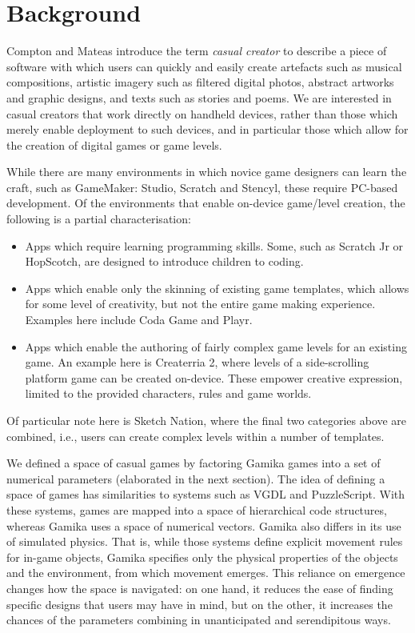 \documentclass{IEEEtran}
\begin{document}
\section{Background}
\label{Section:Backround}
Compton and Mateas \cite{compton2015} introduce the term \emph{casual creator} to describe a piece of software with which users can quickly and easily create artefacts such as musical compositions, artistic imagery such as filtered digital photos, abstract artworks and graphic designs, and texts such as stories and poems. We are interested in casual creators that work directly on handheld devices, rather than those which merely enable deployment to such devices, and in particular those which allow for the creation of digital games or game levels.

While there are many environments in which novice game designers can learn the craft, such as GameMaker: Studio, Scratch and Stencyl, these require PC-based development. Of the environments that enable on-device game/level creation, the following is a partial characterisation:

\begin{itemize}
\item Apps which require learning programming skills. Some,
such as Scratch Jr or HopScotch, are designed to introduce children to coding.
\item Apps which enable only the skinning of existing game
templates, which allows for some level of creativity, but
not the entire game making experience. Examples here
include Coda Game and Playr.
\item Apps which enable the authoring of fairly complex game
levels for an existing game. An example here is Createrria
2, where levels of a side-scrolling platform game can be
created on-device. These empower creative expression,
limited to the provided characters, rules and game worlds.
\end{itemize} 

Of particular note here is Sketch Nation, where the final two categories above are combined, i.e., users can create complex levels within a number of templates.

We defined a space of casual games by factoring Gamika games into a set of numerical parameters (elaborated in the next section). The idea of defining a space of games has similarities to systems such as VGDL \cite{schaul:vgdl} and PuzzleScript. With these systems, games are mapped into a space of hierarchical code structures, whereas Gamika uses a space of numerical vectors. Gamika also differs in its use of simulated physics. That is, while those systems define explicit movement rules for in-game objects, Gamika specifies only the physical properties of the objects and the environment, from which movement emerges. This reliance on emergence changes how the space is navigated: on one hand, it reduces the ease of finding specific designs that users may have in mind, but on the other, it increases the chances of the parameters combining in unanticipated and serendipitous ways.
\end{document}
